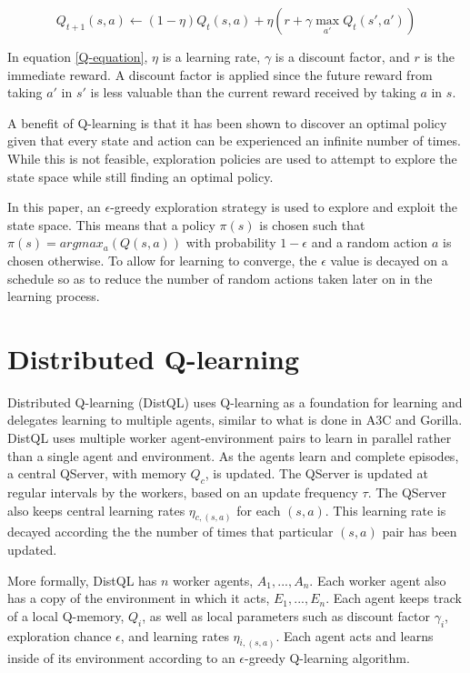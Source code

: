\documentclass[jair,twoside,11pt,theapa]{article}
\begin{document}
\begin{equation}
\label{Q-equation}
Q_{t+1}(s,a) \leftarrow (1-\eta)Q_t(s,a) + \eta(r + \gamma \max_{a'} Q_t(s',a'))
\end{equation}

In equation \ref{Q-equation}, $\eta$ is a learning rate, $\gamma$ is a discount factor, and $r$ is the immediate reward. A discount factor is applied since the future reward from taking $a'$ in $s'$ is less valuable than the current reward received by taking $a$ in $s$. 

A benefit of Q-learning is that it has been shown to discover an optimal policy \cite{qlearning} given that every state and action can be experienced an infinite number of times. While this is not feasible, exploration policies are used to attempt to explore the state space while still finding an optimal policy. 

In this paper, an $\epsilon$-greedy exploration strategy is used to explore and exploit the state space. This means that a policy $\pi(s)$ is chosen such that $\pi(s)= argmax_{a}(Q(s,a))$ with probability $1-\epsilon$ and a random action $a$ is chosen otherwise. To allow for learning to converge, the $\epsilon$ value is decayed on a schedule so as to reduce the number of random actions taken later on in the learning process. 


\section{Distributed Q-learning} 
\label{algorithm}
Distributed Q-learning (DistQL) uses Q-learning as a foundation for learning and delegates learning to multiple agents, similar to what is done in A3C and Gorilla. DistQL uses multiple worker agent-environment pairs to learn in parallel rather than a single agent and environment. As the agents learn and complete episodes, a central QServer, with memory $Q_c$, is updated. The QServer is updated at regular intervals by the workers, based on an update frequency $\tau$. The QServer also keeps central learning rates $\eta_{c,(s,a)}$ for each $(s,a)$. This learning rate is decayed according the the number of times that particular $(s,a)$ pair has been updated. 

More formally, DistQL has $n$ worker agents, $A_1,..., A_n$. Each worker agent also has a copy of the environment in which it acts, $E_1,...,E_n$. Each agent keeps track of a local Q-memory, $Q_i$, as well as local parameters such as discount factor $\gamma_i$, exploration chance $\epsilon$, and learning rates $\eta_{i,(s,a)}$. Each agent acts and learns inside of its environment according to an $\epsilon$-greedy Q-learning algorithm.
\end{document}
